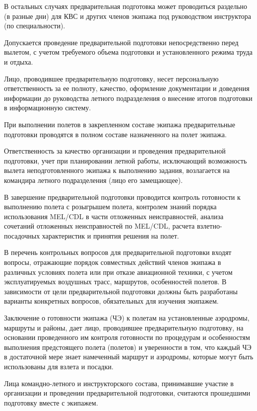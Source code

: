 В остальных случаях предварительная подготовка может проводиться раздельно (в разные дни) для КВС и других членов экипажа под руководством инструктора (по специальности).

Допускается проведение предварительной подготовки непосредственно перед вылетом, с учетом требуемого объема подготовки и установленного режима труда и отдыха.

Лицо, проводившее предварительную подготовку, несет персональную ответственность за ее полноту, качество, оформление документации и доведения информации до руководства летного подразделения о внесение итогов подготовки в информационную систему.

При выполнении полетов в закрепленном составе экипажа предварительные подготовки проводятся в полном составе назначенного на полет экипажа.

Ответственность за качество организации и проведения предварительной подготовки, учет при планировании летной работы, исключающий возможность вылета неподготовленного экипажа к выполнению задания, возлагается на командира летного подразделения (лицо его замещающее).

В завершение предварительной подготовки проводится контроль готовности к выполнению полета с розыгрышем полета, контролем знаний порядка использования MEL/CDL в части отложенных неисправностей, анализа сочетаний отложенных неисправностей по MEL/CDL, расчета взлетно-посадочных характеристик и принятия решения на полет. 

В перечень контрольных вопросов для предварительной подготовки входят вопросы, отражающие порядок совместных действий членов экипажа в различных условиях полета или при отказе авиационной техники, с учетом эксплуатируемых воздушных трасс, маршрутов, особенностей полетов. В зависимости от цели предварительной подготовки должны быть разработаны варианты конкретных вопросов, обязательных для изучения экипажем.

Заключение о готовности экипажа (ЧЭ) к полетам на установленные аэродромы, маршруты и районы, дает лицо, проводившее предварительную подготовку, на основании проведенного им контроля готовности по процедурам и особенностям выполнения предстоящего полета (полетов) и уверенности в том, что каждый ЧЭ в достаточной мере знает намеченный маршрут и аэродромы, которые могут быть использованы для взлета и посадки.

Лица командно-летного и инструкторского состава, принимавшие участие в организации и проведении предварительной подготовки, считаются прошедшими подготовку вместе с экипажем.

